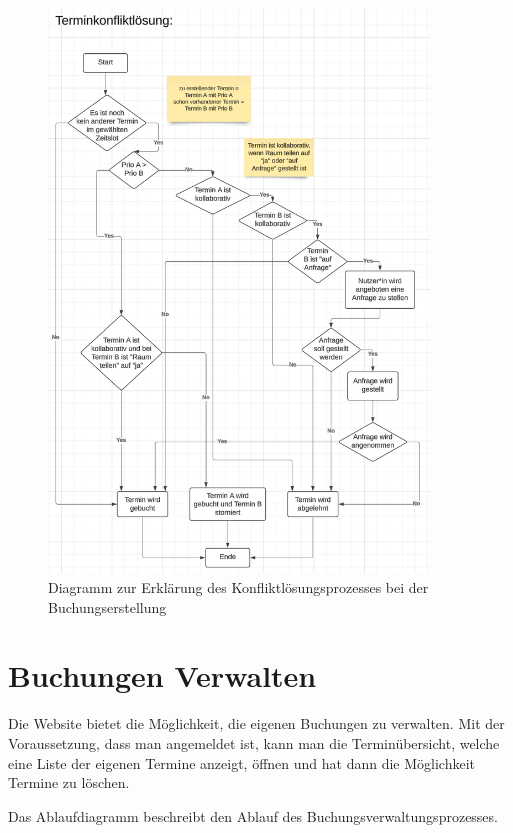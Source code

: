 \begin{figure}[ht]
    \centering
    \includegraphics[width=0.9\textwidth]{figures/activity/terminkonfliktloesung}
    \caption{Diagramm zur Erklärung des Konfliktlösungsprozesses bei der Buchungserstellung}
    \label{fig:resolve-conflict-diagram}
\end{figure}
\clearpage

\section{Buchungen Verwalten}

Die Website bietet die Möglichkeit, die eigenen Buchungen zu verwalten. Mit der Voraussetzung,
dass man angemeldet ist, kann man die Terminübersicht, welche eine Liste der eigenen Termine anzeigt,
öffnen und hat dann die Möglichkeit Termine zu löschen.

Das Ablaufdiagramm beschreibt den Ablauf des Buchungsverwaltungsprozesses.

